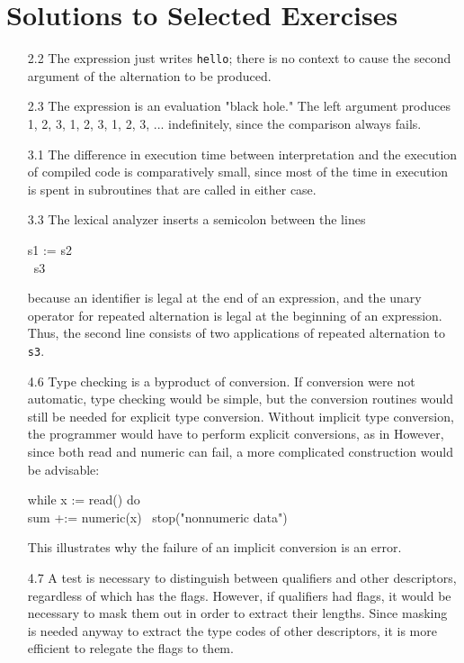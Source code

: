 \chapter{Solutions to Selected Exercises}

\begin{itemize}
\item[2.2]
The expression
just writes \texttt{hello}; there is no context to cause the second argument of the
alternation to be produced.

\goodbreak\item[2.3]
The expression
is an evaluation "black hole." The left argument produces 1, 2, 3, 1, 2, 3,
1, 2, 3, ... indefinitely, since the comparison always fails.

\goodbreak\item[3.1] The difference in execution time between interpretation and the execution
of compiled code is comparatively small, since most of the time in execution is spent
in subroutines that are called in either case.

\goodbreak\item[3.3]
The lexical analyzer inserts a semicolon between the lines
\begin{iconcode}
s1 := s2\\
\textbar\textbar\ s3
\end{iconcode}
because an identifier is legal at the end of an expression, and the unary
operator for repeated alternation is legal at the beginning of an expression. 
Thus, the second line consists of two applications of repeated alternation to \texttt{s3}.

\goodbreak\item[4.6]
Type checking is a byproduct of conversion. If conversion were not
automatic, type checking would be simple, but the conversion routines
would still be needed for explicit type conversion. Without implicit type
conversion, the programmer would have to perform explicit conversions,
as in
However, since both read and numeric can fail, a more complicated construction
would be advisable:
\begin{iconcode}
while x := read() do\\
\>sum +:= numeric(x) \textbar\ stop("nonnumeric data")
\end{iconcode}
This illustrates why the failure of an implicit conversion is an error.

\goodbreak\item[4.7]
A test is necessary to distinguish between qualifiers and other descriptors,
regardless of which has the flags. However, if qualifiers had flags, it
would be necessary to mask them out in order to extract their lengths.
Since masking is needed anyway to extract the type codes of other
descriptors, it is more efficient to relegate the flags to them.


\end{itemize}
